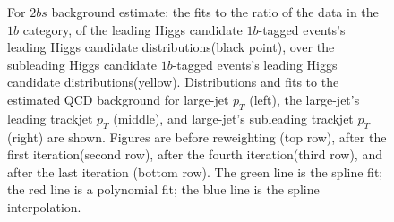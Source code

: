 \begin{figure}[htbp!]
\begin{center}
\caption{For $2bs$ background estimate: the fits to the ratio of the data in the $1b$ category, of the leading Higgs candidate $1b$-tagged events's leading Higgs candidate distributions(black point), over the subleading Higgs candidate $1b$-tagged events's leading Higgs candidate distributions(yellow). Distributions and fits to the estimated QCD background for large-\R jet $p_{T}$ (left),  the large-\R jet's leading trackjet $p_T$ (middle), and large-\R jet's subleading trackjet $p_T$ (right) are shown.  Figures are before reweighting (top row), after the first iteration(second row), after the fourth iteration(third row), and after the last iteration (bottom row). The green line is the spline fit; the red line is a polynomial fit; the blue line is the spline interpolation.}
\label{fig:rw-2bs-subl}
\end{center}
\end{figure}

